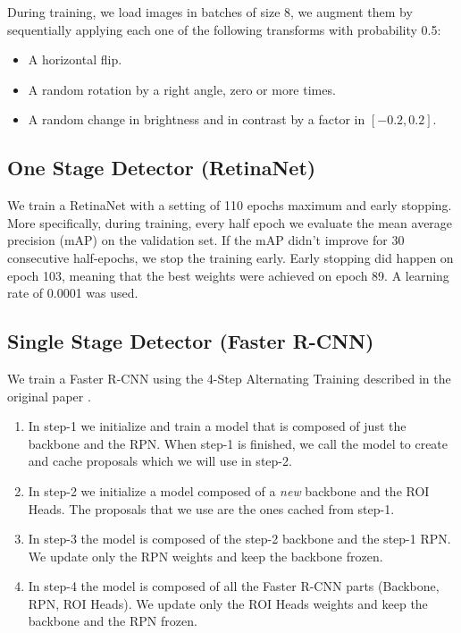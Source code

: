 \documentclass{article}
\begin{document}
During training, we load images in batches of size 8, we augment them by sequentially applying each one of the following transforms with probability 0.5:
\begin{itemize}
    \item A horizontal flip.
    \item A random rotation by a right angle, zero or more times.
    \item A random change in brightness and in contrast by a factor in \([-0.2, 0.2]\).
\end{itemize}

\subsection{One Stage Detector (RetinaNet)}
We train a RetinaNet \cite{retinanet} with a setting of 110 epochs maximum and early stopping. More specifically, during training, every half epoch we evaluate the mean average precision (mAP) on the validation set. If the mAP didn’t improve for 30 consecutive half-epochs, we stop the training early. Early stopping did happen on epoch 103, meaning that the best weights were achieved on epoch 89. A learning rate of 0.0001 was used.

\subsection{Single Stage Detector (Faster R-CNN)}

We train a Faster R-CNN using the 4-Step Alternating Training described in the original paper \cite{fasterrcnn}.

\begin{enumerate}
    \item In step-1 we initialize and train a model that is composed of just the backbone and the RPN. When step-1 is finished, we call the model to create and cache proposals which we will use in step-2.
    \item In step-2 we initialize a model composed of a \emph{new} backbone and the ROI Heads. The proposals that we use are the ones cached from step-1.
    \item In step-3 the model is composed of the step-2 backbone and the step-1 RPN. We update only the RPN weights and keep the backbone frozen.
    \item In step-4 the model is composed of all the Faster R-CNN parts (Backbone, RPN, ROI Heads). We update only the ROI Heads weights and keep the backbone and the RPN frozen.
\end{enumerate}
\end{document}
